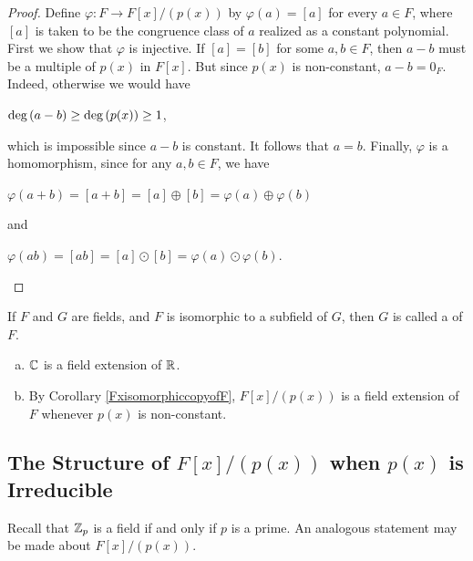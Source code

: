 \documentclass[11pt,fleqn,dvipsnames,usenames]{article}
\newcommand{\p}{\noindent}
\begin{document}
\begin{proof}
\p Define $\varphi:F\to F[x]/(p(x))$ by $\varphi(a) = [a]$ for every $a\in F$, where $[a]$ is taken to be the congruence class of $a$ realized as a constant polynomial.  First we show that $\varphi$ is injective.  If $[a] = [b]$ for some $a,b\in F$, then $a-b$ must be a multiple of $p(x)$ in $F[x]$.  But since $p(x)$ is non-constant, $a-b = 0_{F}$.  Indeed, otherwise we would have
\begin{center}
$\text{deg}\left(a - b\right) \geq \text{deg}\left(p(x)\right)\geq 1$,
\end{center}
which is impossible since $a-b$ is constant.  It follows that $a = b$.  Finally, $\varphi$ is a homomorphism, since for any $a,b\in F$, we have
\begin{center}
$\varphi(a+b) = [a+b] = [a]\oplus[b] = \varphi(a) \oplus \varphi(b)$
\end{center}
and
\begin{center}
$\varphi(ab) = [ab] = [a]\odot[b] = \varphi(a) \odot \varphi(b)$.
\end{center}
\end{proof}
\vsp

\begin{definition}
If $F$ and $G$ are fields, and $F$ is isomorphic to a subfield of $G$, then $G$ is called a  of $F$.
\end{definition}

\begin{examples}
\begin{enumerate}[(a)]
\item $\mathbb{C}$ is a field extension of $\mathbb{R}$.
\item By Corollary \ref{FxisomorphiccopyofF}, $F[x]/(p(x))$ is a field extension of $F$ whenever $p(x)$ is non-constant.
\end{enumerate}
\end{examples}

\subsection{The Structure of \texorpdfstring{$F[x]/(p(x))$}{F[x]/(p(x))} when \texorpdfstring{$p(x)$}{p(x)} is Irreducible}

\p Recall that $\mathbb{Z}_p$ is a field if and only if $p$ is a prime.  An analogous statement may be made about $F[x]/(p(x))$.
\end{document}
